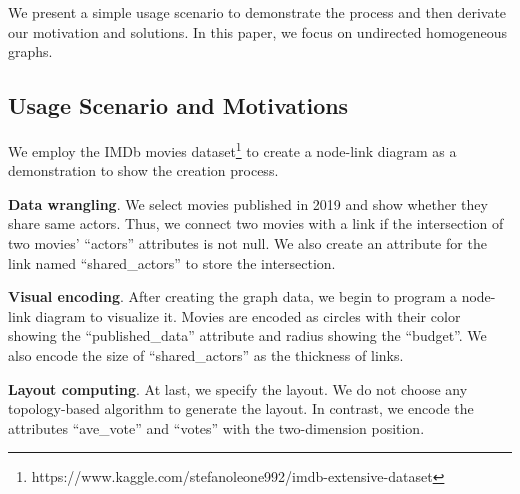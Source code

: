 We present a simple usage scenario to demonstrate the process and then derivate our motivation and solutions.
In this paper, we focus on undirected homogeneous graphs.


\subsection{Usage Scenario and Motivations}

We employ the IMDb movies dataset\footnote{https://www.kaggle.com/stefanoleone992/imdb-extensive-dataset} to create a node-link diagram as a demonstration to show the creation process.

\textbf{Data wrangling}. 
We select movies published in 2019 and show whether they share same actors.
Thus, we connect two movies with a link if the intersection of two movies' ``actors'' attributes is not null.
We also create an attribute for the link named ``shared\_actors'' to store the intersection.

\textbf{Visual encoding}.
After creating the graph data, we begin to program a node-link diagram to visualize it.
Movies are encoded as circles with their color showing the ``published\_data'' attribute and radius showing the ``budget''.
We also encode the size of ``shared\_actors'' as the thickness of links.

\textbf{Layout computing}.
At last, we specify the layout. We do not choose any topology-based algorithm to generate the layout. 
In contrast, we encode the attributes ``ave\_vote'' and ``votes'' with the two-dimension position.

